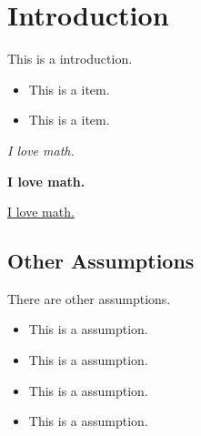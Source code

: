 \section{Introduction}  %

This is a introduction.

\begin{itemize}  %
\item This is a item.
\item This is a item.
\end{itemize}  %

\textit{I love math.}  %

\textbf{I love math.}  %

\underline{I love math.}  %

\subsection{Other Assumptions}  %
There are other assumptions.

\begin{itemize}  %
\item This is a assumption.
\item This is a assumption.
\item This is a assumption.
\item This is a assumption.
\end{itemize}  %
